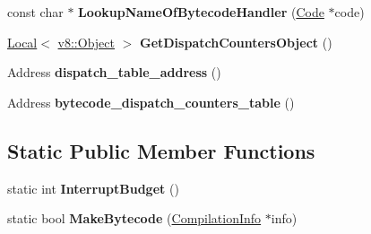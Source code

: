 \begin{DoxyCompactItemize}
\item 
const char $\ast$ {\bfseries Lookup\+Name\+Of\+Bytecode\+Handler} (\hyperlink{classv8_1_1internal_1_1_code}{Code} $\ast$code)\hypertarget{classv8_1_1internal_1_1interpreter_1_1_interpreter_a22b1ec5fc00fbc07b16c497e08565677}{}\label{classv8_1_1internal_1_1interpreter_1_1_interpreter_a22b1ec5fc00fbc07b16c497e08565677}

\item 
\hyperlink{classv8_1_1_local}{Local}$<$ \hyperlink{classv8_1_1_object}{v8\+::\+Object} $>$ {\bfseries Get\+Dispatch\+Counters\+Object} ()\hypertarget{classv8_1_1internal_1_1interpreter_1_1_interpreter_aa9051f15da75ce1c80fbe37fb0fd9a73}{}\label{classv8_1_1internal_1_1interpreter_1_1_interpreter_aa9051f15da75ce1c80fbe37fb0fd9a73}

\item 
Address {\bfseries dispatch\+\_\+table\+\_\+address} ()\hypertarget{classv8_1_1internal_1_1interpreter_1_1_interpreter_ad208aa6e4cd6c4440dd43eee243ccd02}{}\label{classv8_1_1internal_1_1interpreter_1_1_interpreter_ad208aa6e4cd6c4440dd43eee243ccd02}

\item 
Address {\bfseries bytecode\+\_\+dispatch\+\_\+counters\+\_\+table} ()\hypertarget{classv8_1_1internal_1_1interpreter_1_1_interpreter_ac242337609472144f10ece1eb04fa348}{}\label{classv8_1_1internal_1_1interpreter_1_1_interpreter_ac242337609472144f10ece1eb04fa348}

\end{DoxyCompactItemize}
\subsection*{Static Public Member Functions}
\begin{DoxyCompactItemize}
\item 
static int {\bfseries Interrupt\+Budget} ()\hypertarget{classv8_1_1internal_1_1interpreter_1_1_interpreter_a38cd11e6d5af0fc621b321ff2d8fbdbd}{}\label{classv8_1_1internal_1_1interpreter_1_1_interpreter_a38cd11e6d5af0fc621b321ff2d8fbdbd}

\item 
static bool {\bfseries Make\+Bytecode} (\hyperlink{classv8_1_1internal_1_1_compilation_info}{Compilation\+Info} $\ast$info)\hypertarget{classv8_1_1internal_1_1interpreter_1_1_interpreter_ac68658e8a2cc2867bd1225ede9036e8d}{}\label{classv8_1_1internal_1_1interpreter_1_1_interpreter_ac68658e8a2cc2867bd1225ede9036e8d}

\end{DoxyCompactItemize}
